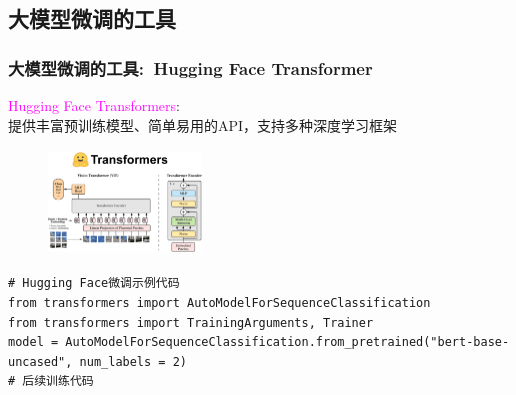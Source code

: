 \subsection{大模型微调的工具}
\begin{frame}[fragile]
	\frametitle{大模型微调的工具:~\textrm{Hugging Face Transformer}}
	\textcolor{magenta}{\textrm{Hugging Face Transformers}}:\\
	提供丰富预训练模型、简单易用的\textrm{API}，支持多种深度学习框架
\begin{figure}[h!]
\vspace*{-0.01in}
\centering
\includegraphics[height=1.1in, width=1.6in, viewport=0 0 613 402,clip]{Figures/hugging-face-vit.png}
\label{hugging-face-vit}
\end{figure}
            \begin{lstlisting}[style=pythonstyle]
# Hugging Face微调示例代码
from transformers import AutoModelForSequenceClassification
from transformers import TrainingArguments, Trainer
model = AutoModelForSequenceClassification.from_pretrained("bert-base-uncased", num_labels = 2)
# 后续训练代码
            \end{lstlisting}
\end{frame}

